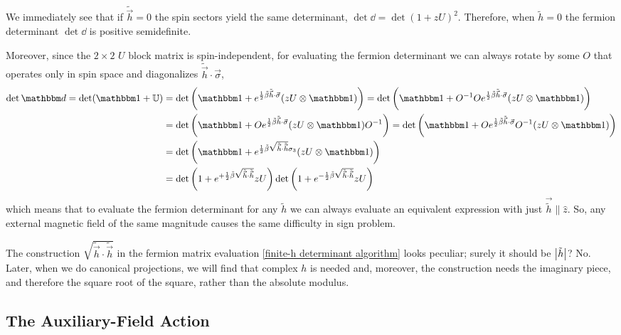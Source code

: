 We immediately see that if $\tilde{\vec{h}} = 0$ the spin sectors yield the same determinant, $\det\dd = \det (1+zU)^2$.
Therefore, when $\tilde{h}=0$ the fermion determinant $\det\dd$ is positive semidefinite.

Moreover, since the $2\times2$ $U$ block matrix is spin-independent, for evaluating the fermion determinant we can always rotate by some $O$ that operates only in spin space and diagonalizes $\tilde{\vec{h}}\cdot\vec{\sigma}$,
\begin{align}
	\det \dd 
	= \det(\one+\UU)
	&= \det\left(\one + e^{\half \tilde{\beta} \tilde{\vec{h}}\cdot\vec{\sigma}}(zU\otimes\one)\right)
	= \det\left(\one + O\inverse O e^{\half \tilde{\beta} \tilde{\vec{h}}\cdot\vec{\sigma}} (zU\otimes\one)\right)
	\nonumber\\
	&= \det\left(\one + O e^{\half \tilde{\beta} \tilde{\vec{h}}\cdot\vec{\sigma}} (zU\otimes\one)O\inverse \right)
	= \det\left(\one + O e^{\half \tilde{\beta} \tilde{\vec{h}}\cdot\vec{\sigma}} O\inverse (zU\otimes\one) \right)
	\nonumber\\
	&= \det\left(\one + e^{\half \tilde{\beta} \sqrt{\tilde{\vec{h}}\cdot\tilde{\vec{h}}} \sigma_3 } (zU\otimes\one) \right)
	\\
	&= \det\left( 1 + e^{+\half \tilde{\beta}\sqrt{\tilde{\vec{h}}\cdot\tilde{\vec{h}}}} zU\right)\det\left( 1 + e^{-\half \tilde{\beta}\sqrt{\tilde{\vec{h}}\cdot\tilde{\vec{h}}}} zU\right)
	\label{eq:finite-h determinant algorithm}
\end{align}
which means that to evaluate the fermion determinant for any $\tilde{h}$ we can always evaluate an equivalent expression with just $\vec{\tilde{h}}\parallel\hat{z}$.
So, any external magnetic field of the same magnitude causes the same difficulty in sign problem.

The construction $\sqrt{\tilde{\vec{h}}\cdot\tilde{\vec{h}}}$ in the fermion matrix evaluation \eqref{finite-h determinant algorithm} looks peculiar; surely it should be $\left| \tilde{h} \right|$?
No.
Later, when we do canonical projections, we will find that complex $h$ is needed and, moreover, the construction needs the imaginary piece, and therefore the square root of the square, rather than the absolute modulus.

\subsection{The Auxiliary-Field Action}

